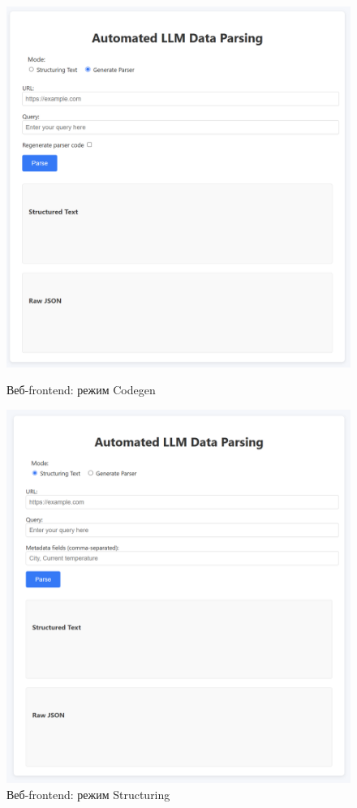 \begin{figure}[h]
    \centering
    \begin{minipage}[b]{0.48\textwidth}
        \centering
        \includegraphics[width=\textwidth]{Include/dashboard_codegen.png}
        \caption{Веб-frontend: режим Codegen}
        \label{fig:dash_codegen}
    \end{minipage}
    \hfill
    \begin{minipage}[b]{0.48\textwidth}
        \centering
        \includegraphics[width=\textwidth]{Include/dashboard_structuring.png}
        \caption{Веб-frontend: режим Structuring}
        \label{fig:dash_structuring}
    \end{minipage}
\end{figure}

